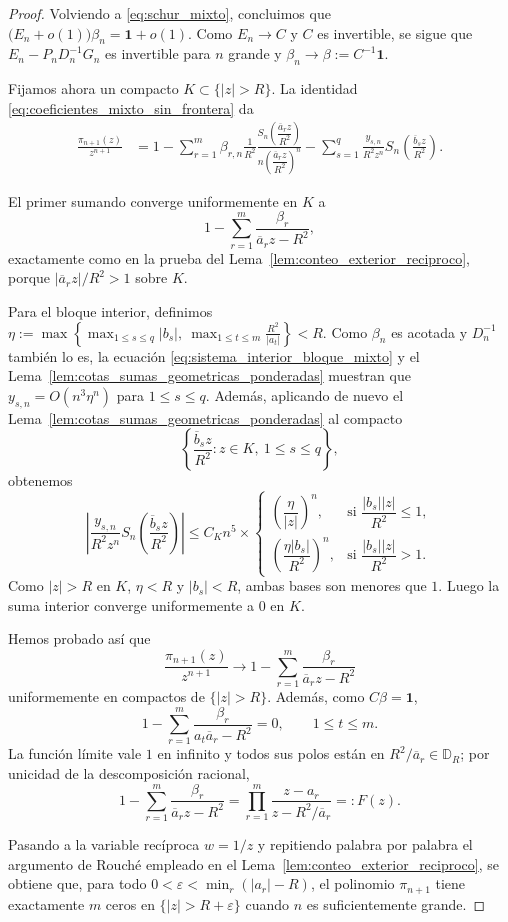 \begin{proof}
	Volviendo a \eqref{eq:schur_mixto}, concluimos que $\bigl(E_n+o(1)\bigr)\beta_n=\mathbf 1+o(1)$. Como $E_n\to C$ y $C$ es invertible, se sigue que $E_n-P_nD_n^{-1}G_n$ es invertible para $n$ grande y $\beta_n\longrightarrow \beta:=C^{-1}\mathbf 1$.

	Fijamos ahora un compacto $K\subset\{|z|>R\}$. La identidad \eqref{eq:coeficientes_mixto_sin_frontera} da
	\begin{align*}
		\frac{\pi_{n+1}(z)}{z^{n+1}}
		 & =1
		-\sum_{r=1}^m \beta_{r,n}\frac1{R^2}\frac{S_n\!\left(\dfrac{\overline a_r z}{R^2}\right)}{n\left(\dfrac{\overline a_r z}{R^2}\right)^n}
		-\sum_{s=1}^q \frac{y_{s,n}}{R^2z^n}S_n\!\left(\frac{\overline b_s z}{R^2}\right).
	\end{align*}

	El primer sumando converge uniformemente en $K$ a
	\[
		1-\sum_{r=1}^m \frac{\beta_r}{\overline a_r z-R^2},
	\]
	exactamente como en la prueba del Lema~\ref{lem:conteo_exterior_reciproco}, porque $|\overline a_r z|/R^2>1$ sobre $K$.

	Para el bloque interior, definimos $\eta:=\max\left\{\max_{1\le s\le q}|b_s|,\ \max_{1\le t\le m}\frac{R^2}{|a_t|}\right\}<R$.
	Como $\beta_n$ es acotada y $D_n^{-1}$ también lo es, la ecuación \eqref{eq:sistema_interior_bloque_mixto} y el Lema~\ref{lem:cotas_sumas_geometricas_ponderadas} muestran que
	$y_{s,n}=O(n^3\eta^n)$ para $1\le s\le q$.
	Además, aplicando de nuevo el Lema~\ref{lem:cotas_sumas_geometricas_ponderadas} al compacto
	\[
		\left\{\frac{\overline b_s z}{R^2}: z\in K,\ 1\le s\le q\right\},
	\]
	obtenemos
	\[
		\left|\frac{y_{s,n}}{R^2z^n}S_n\!\left(\frac{\overline b_s z}{R^2}\right)\right|
		\le C_K n^5\times
		\begin{cases}
			\left(\dfrac{\eta}{|z|}\right)^n,      & \text{si } \dfrac{|b_s||z|}{R^2}\le1, \\[1.2ex]
			\left(\dfrac{\eta|b_s|}{R^2}\right)^n, & \text{si } \dfrac{|b_s||z|}{R^2}>1.
		\end{cases}
	\]
	Como $|z|>R$ en $K$, $\eta<R$ y $|b_s|<R$, ambas bases son menores que $1$. Luego la suma interior converge uniformemente a $0$ en $K$.

	Hemos probado así que
	\[
		\frac{\pi_{n+1}(z)}{z^{n+1}}
		\longrightarrow
		1-\sum_{r=1}^m\frac{\beta_r}{\overline a_r z-R^2}
	\]
	uniformemente en compactos de $\{|z|>R\}$. Además, como $C\beta=\mathbf 1$,
	\[
		1-\sum_{r=1}^m\frac{\beta_r}{a_t\overline a_r-R^2}=0,
		\qquad 1\le t\le m.
	\]
	La función límite vale $1$ en infinito y todos sus polos están en $R^2/\overline a_r\in\mathbb D_R$; por unicidad de la descomposición racional,
	\[
		1-\sum_{r=1}^m\frac{\beta_r}{\overline a_r z-R^2}
		=
		\prod_{r=1}^m\frac{z-a_r}{z-R^2/\overline a_r}
		=:F(z).
	\]

	Pasando a la variable recíproca $w=1/z$ y repitiendo palabra por palabra el argumento de Rouché empleado en el Lema~\ref{lem:conteo_exterior_reciproco}, se obtiene que, para todo $0<\varepsilon<\min_r(|a_r|-R)$, el polinomio $\pi_{n+1}$ tiene exactamente $m$ ceros en $\{|z|>R+\varepsilon\}$ cuando $n$ es suficientemente grande.
\end{proof}

